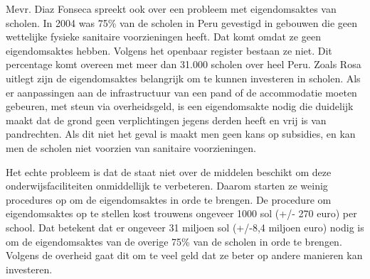 Mevr. Diaz Fonseca spreekt ook over een probleem met eigendomsaktes van scholen. In 2004 was 75\% van de scholen in Peru gevestigd in gebouwen die geen wettelijke fysieke sanitaire voorzieningen heeft. Dat komt omdat ze geen eigendomsaktes hebben. Volgens het openbaar register bestaan ze niet. Dit percentage komt overeen met meer dan 31.000 scholen over heel Peru. Zoals Rosa uitlegt zijn de eigendomsaktes belangrijk om te kunnen investeren in scholen. Als er aanpassingen aan de infrastructuur van een pand of de accommodatie moeten gebeuren, met steun via overheidsgeld, is een eigendomsakte nodig die duidelijk maakt dat de grond geen verplichtingen jegens derden heeft en vrij is van pandrechten. Als dit niet het geval is maakt men geen kans op subsidies, en kan men de scholen niet voorzien van sanitaire voorzieningen.

Het echte probleem is dat de staat niet over de middelen beschikt om deze onderwijsfaciliteiten onmiddellijk te verbeteren. Daarom starten ze weinig procedures op om de eigendomsaktes in orde te brengen. De procedure om eigendomsaktes op te stellen kost trouwens ongeveer 1000 sol (+/- 270 euro) per school. Dat betekent dat er ongeveer 31 miljoen sol (+/-8,4 miljoen euro) nodig is om de eigendomsaktes van de overige 75\% van de scholen in orde te brengen. Volgens de overheid gaat dit om te veel geld dat ze beter op andere manieren kan investeren. \autocite{larepublica2004}

